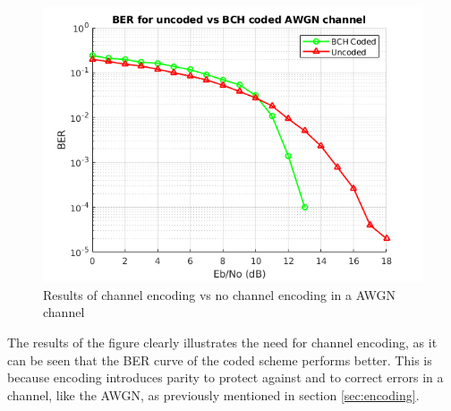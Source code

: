\documentclass[11pt]{report}
\begin{document}
\begin{figure}[h!]
	\label{fig:uncoded}
	\centering
	\includegraphics[scale=0.85]{resources/uncoded.png}
	\caption{Results of channel encoding vs no channel encoding in a AWGN channel}
\end{figure}
\vspace{12pt}
The results of the figure clearly illustrates the need for channel encoding, as it can be seen that the BER curve of the coded scheme performs better. This is because encoding introduces parity to protect against and to correct errors in a channel, like the AWGN, as previously mentioned in section \ref{sec:encoding}.


\end{document}
